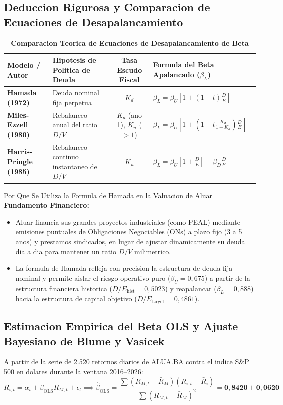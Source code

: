 \documentclass[10pt,a4paper]{article}
\theoremstyle{definition}
\begin{document}
\subsection{Deduccion Rigurosa y Comparacion de Ecuaciones de Desapalancamiento}

\begin{table}[H]
\centering
\caption{\textbf{Comparacion Teorica de Ecuaciones de Desapalancamiento de Beta}}
\small
\begin{tabular}{llcl}
\toprule
\textbf{Modelo / Autor} & \textbf{Hipotesis de Politica de Deuda} & \textbf{Tasa Escudo Fiscal} & \textbf{Formula del Beta Apalancado ($\beta_L$)} \\
\midrule
\textbf{Hamada (1972)} & Deuda nominal fija perpetua & $K_d$ & $\beta_L = \beta_U [1 + (1 - t)\frac{D}{E}]$ \\
\textbf{Miles-Ezzell (1980)} & Rebalanceo anual del ratio $D/V$ & $K_d$ (ano 1), $K_u$ ($>1$) & $\beta_L = \beta_U [1 + (1 - t \frac{K_d}{1+K_d})\frac{D}{E}]$ \\
\textbf{Harris-Pringle (1985)} & Rebalanceo continuo instantaneo de $D/V$ & $K_u$ & $\beta_L = \beta_U [1 + \frac{D}{E}] - \beta_D \frac{D}{E}$ \\
\bottomrule
\end{tabular}
\end{table}

\begin{conceptbox}{Por Que Se Utiliza la Formula de Hamada en la Valuacion de Aluar}
\textbf{Fundamento Financiero:}
\begin{itemize}
    \item Aluar financia sus grandes proyectos industriales (como PEAL) mediante emisiones puntuales de Obligaciones Negociables (ONs) a plazo fijo (3 a 5 anos) y prestamos sindicados, en lugar de ajustar dinamicamente su deuda dia a dia para mantener un ratio $D/V$ milimetrico.
    \item La formula de Hamada refleja con precision la estructura de deuda fija nominal y permite aislar el riesgo operativo puro ($\beta_U = 0,675$) a partir de la estructura financiera historica ($D/E_{\text{hist}} = 0,5023$) y reapalancar ($\beta_L = 0,888$) hacia la estructura de capital objetivo ($D/E_{\text{target}} = 0,4861$).
\end{itemize}
\end{conceptbox}

\subsection{Estimacion Empirica del Beta OLS y Ajuste Bayesiano de Blume y Vasicek}
A partir de la serie de 2.520 retornos diarios de ALUA.BA contra el indice S\&P 500 en dolares durante la ventana 2016--2026:
\begin{equation}
R_{i,t} = \alpha_i + \beta_{\text{OLS}} R_{M,t} + \epsilon_t \implies \hat{\beta}_{\text{OLS}} = \frac{\sum (R_{M,t} - \bar{R}_M)(R_{i,t} - \bar{R}_i)}{\sum (R_{M,t} - \bar{R}_M)^2} = \mathbf{0,8420 \pm 0,0620}
\end{equation}
\end{document}
